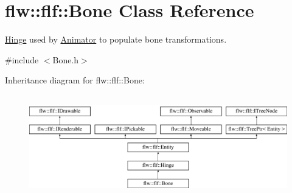\hypertarget{classflw_1_1flf_1_1Bone}{}\section{flw\+:\+:flf\+:\+:Bone Class Reference}
\label{classflw_1_1flf_1_1Bone}


\hyperlink{classflw_1_1flf_1_1Hinge}{Hinge} used by \hyperlink{classflw_1_1flf_1_1Animator}{Animator} to populate bone transformations.  




{\ttfamily \#include $<$Bone.\+h$>$}

Inheritance diagram for flw\+:\+:flf\+:\+:Bone\+:\begin{figure}[H]
\begin{center}
\leavevmode
\includegraphics[height=4.487180cm]{classflw_1_1flf_1_1Bone}
\end{center}
\end{figure}
